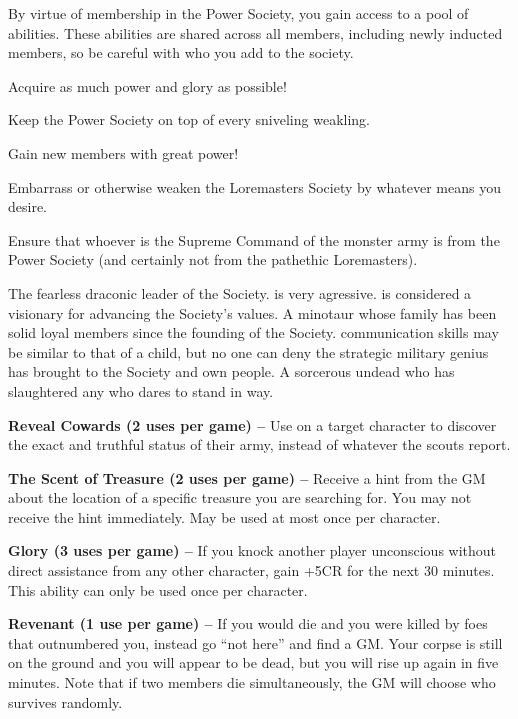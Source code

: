\documentclass[blue]{guildcamp2}
\begin{document}
By virtue of membership in the Power Society, you gain access to a pool of abilities. These abilities are shared across all members, including newly inducted members, so be careful with who you add to the society.

\begin{itemz}[Goals]
  \item Acquire as much power and glory as possible!
  \item Keep the Power Society on top of every sniveling weakling.
  \item Gain new members with great power!
  \item Embarrass or otherwise weaken the Loremasters Society by whatever means you desire.
    \item Ensure that whoever is the Supreme Command of the monster army is from the Power Society (and certainly not from the pathethic Loremasters).
\end{itemz}


\begin{members} 
  \member{\cRed{}} The fearless draconic leader of the Society. \cRed{\They} is very agressive. \cRed{\They} is considered a visionary for advancing the Society's values.
	\member{\cMinotaur{}} A minotaur whose family has been solid loyal members since the founding of the Society. \cMinotaur{\Their} communication skills may be similar to that of a child, but no one can deny the strategic military genius \cMinotaur{\they} has brought to the Society and \cMinotaur{\their} own people.
	\member{\cLich{}} A sorcerous undead who has slaughtered any who dares to stand in \cLich{\their} way.
\end{members}

\begin{itemz}
	\item \textbf{Reveal Cowards (2 uses per game) --} Use on a target character to discover the exact and truthful status of their army, instead of whatever the scouts report.
	\item \textbf{The Scent of Treasure (2 uses per game) --} Receive a hint from the GM about the location of a specific treasure you are searching for. You may not receive the hint immediately. May be used at most once per character.
\item \textbf{Glory (3 uses per game) --} If you knock another player unconscious without direct assistance from any other character, gain +5CR for the next 30 minutes. This ability can only be used once per character.
	\item \textbf{Revenant (1 use per game) --} If you would die and you were killed by foes that outnumbered you, instead go ``not here'' and find a GM.  Your corpse is still on the ground and you will appear to be dead, but you will rise up again in five minutes. Note that if two members die simultaneously, the GM will choose who survives randomly.
\end{itemz}
\end{document}
